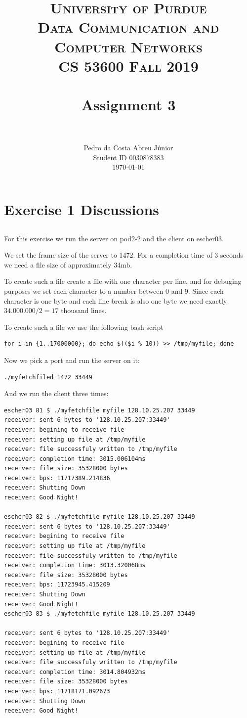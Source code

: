 \documentclass[paper=a4, fontsize=11pt]{scrartcl}
\title{
		\usefont{OT1}{bch}{b}{n}
		\normalfont \normalsize \textsc{University of Purdue\\
      Data Communication and Computer Networks\\
      CS 53600 Fall 2019} \\ [25pt]
		\horrule{0.5pt} \\[0.4cm]
		\huge Assignment 3\\
		\horrule{2pt} \\[0.5cm]
}
\author{
		\normalfont\normalsize Pedro da Costa Abreu Júnior\\ [-5pt]
    \normalsize Student ID 0030878383\\[-5pt]
    \normalsize \today
}
\date{}
\numberwithin{equation}{section}		%
\numberwithin{figure}{section}			%
\numberwithin{table}{section}				%
\begin{document}
\maketitle

\section{Exercise 1 Discussions}
\subsection{}
For this exercise we run the server on pod2-2 and the client on
escher03.

We set the frame size of the server to 1472. For a completion
time of 3 seconds we need a file size of approximately 34mb.

To create such a file create a file with one character per line,
and for debuging purposes we set each character to a number between
0 and 9. Since each character is one byte and each line break
is also one byte we need exactly $34.000.000 / 2 = 17$ thousand lines.

To create such a file we use the following bash script

\begin{verbatim}
for i in {1..17000000}; do echo $(($i % 10)) >> /tmp/myfile; done
\end{verbatim}

Now we pick a port and run the server on it:

\begin{verbatim}
./myfetchfiled 1472 33449
\end{verbatim}

And we run the client three times:

\begin{verbatim}
escher03 81 $ ./myfetchfile myfile 128.10.25.207 33449
receiver: sent 6 bytes to '128.10.25.207:33449'
receiver: begining to receive file
receiver: setting up file at /tmp/myfile
receiver: file successfuly written to /tmp/myfile
receiver: completion time: 3015.006104ms
receiver: file size: 35328000 bytes
receiver: bps: 11717389.214836
receiver: Shutting Down
receiver: Good Night!

escher03 82 $ ./myfetchfile myfile 128.10.25.207 33449
receiver: sent 6 bytes to '128.10.25.207:33449'
receiver: begining to receive file
receiver: setting up file at /tmp/myfile
receiver: file successfuly written to /tmp/myfile
receiver: completion time: 3013.320068ms
receiver: file size: 35328000 bytes
receiver: bps: 11723945.415209
receiver: Shutting Down
receiver: Good Night!
escher03 83 $ ./myfetchfile myfile 128.10.25.207 33449

receiver: sent 6 bytes to '128.10.25.207:33449'
receiver: begining to receive file
receiver: setting up file at /tmp/myfile
receiver: file successfuly written to /tmp/myfile
receiver: completion time: 3014.804932ms
receiver: file size: 35328000 bytes
receiver: bps: 11718171.092673
receiver: Shutting Down
receiver: Good Night!
\end{verbatim}
\end{document}
